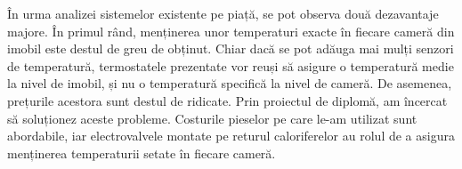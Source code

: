 	În urma analizei sistemelor existente pe piață, se pot observa două dezavantaje majore. În primul rând, menținerea unor temperaturi exacte în fiecare cameră din imobil este destul de greu de obținut. Chiar dacă se pot adăuga mai mulți senzori de temperatură, termostatele prezentate vor reuși să asigure o temperatură medie la nivel de imobil, și nu o temperatură specifică la nivel de cameră. De asemenea, prețurile acestora sunt destul de ridicate. Prin proiectul de diplomă, am încercat să soluționez aceste probleme. Costurile pieselor pe care le-am utilizat sunt abordabile, iar electrovalvele montate pe returul caloriferelor au rolul de a asigura menținerea temperaturii setate în fiecare cameră.
